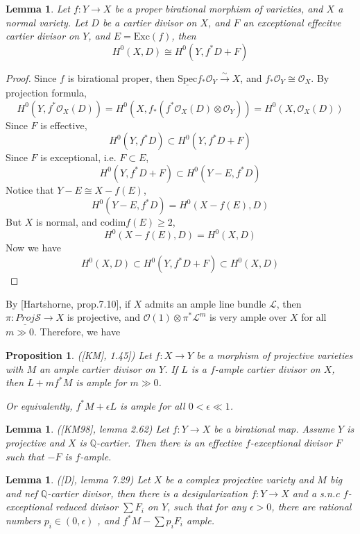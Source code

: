 \documentclass{article}
\newtheorem{prop}[defn]{Proposition}
\newtheorem{lem}[defn]{Lemma}
\begin{document}
\begin{lem}
  Let $ f:Y\to X $ be a proper birational morphism of varieties, and $ X $ a normal variety. Let $ D $ be a cartier divisor on $ X $, and $ F $ an exceptional effecitve cartier divisor on $ Y $, and $ E=\mathrm{Exc}(f) $, then 
  $$ H^0(X,D)\cong H^0(Y,f^*D+F) $$ 
\end{lem}
\begin{proof}
  Since $ f $ is birational proper, then $  \underline{\mathrm{Spec}}f_*\mathcal{O}_Y\xrightarrow{\sim}X $, and $ f_*\mathcal{O}_Y\cong \mathcal{O}_X $. By projection formula, 
  \[ H^0(Y,f^*\mathcal{O}_X(D))=H^0\left(X,f_*\left(f^*\mathcal{O}_X(D)\otimes \mathcal{O}_Y\right)\right)=H^0(X,\mathcal{O}_X(D))\]
  Since $ F $ is effective,
  \[ H^0(Y,f^*D)\subset H^0(Y,f^*D+F) \]
  Since $ F $ is exceptional, i.e. $ F\subset E $,
  \[ H^0(Y,f^*D+F)\subset H^0(Y-E,f^*D) \]
  Notice that $ Y-E\cong X-f(E)  $,
  \[ H^0(Y-E,f^*D)= H^0(X-f(E),D) \]
  But $ X $ is normal, and $ \mathrm{codim} f(E)\geqslant 2 $,
  \[  H^0(X-f(E),D) =H^0(X,D) \]
  Now we have 
  \[ H^0(X,D) \subset H^0(Y,f^*D+F)\subset H^0(X,D) \]
\end{proof}

By [Hartshorne, prop.7.10],  if $ X $ admits an ample line bundle $ \mathcal{L} $, then  $\pi: \underline{Proj}\mathcal{S}\to X $ is projective, and $ \mathcal{O}(1)\otimes \pi^*\mathcal{L}^m $ is very ample over $ X $  for all $ m\gg 0 $. Therefore, we have 
\begin{prop}
  ([KM], 1.45]) Let $ f:X\to Y $ be a morphism of projective varieties with $ M $ an ample cartier divisor on $ Y $. If $ L $ is a $ f $-ample cartier divisor on $ X $, then $ L+mf^*M $ is ample for $ m\gg 0 $. 
  
  Or equivalently, $ f^*M+\epsilon L $ is ample for all $ 0<\epsilon \ll 1 $.
\end{prop}

\begin{lem}
  ([KM98], lemma 2.62) Let $ f:Y\to X $ be a birational map. Assume  $ Y $ is projective and $ X $ is $ \mathbb{Q} $-cartier. Then there is an effective $ f $-exceptional divisor $ F $ such that $ -F $ is $ f $-ample. 
\end{lem}

\begin{lem}
  ([D], lemma 7.29) Let $ X $ be a complex projective variety and $ M $ big and nef $ \mathbb{Q} $-cartier divisor, then  there is a desigularization $ f:Y\to X $ and a s.n.c $ f $-exceptional reduced divisor $ \sum F_i $ on $ Y $, such that for any $ \epsilon>0 $, there are rational numbers $ p_i\in (0,\epsilon) $ , and $ f^*M-\sum p_iF_i $ ample. 
\end{lem}
\end{document}
